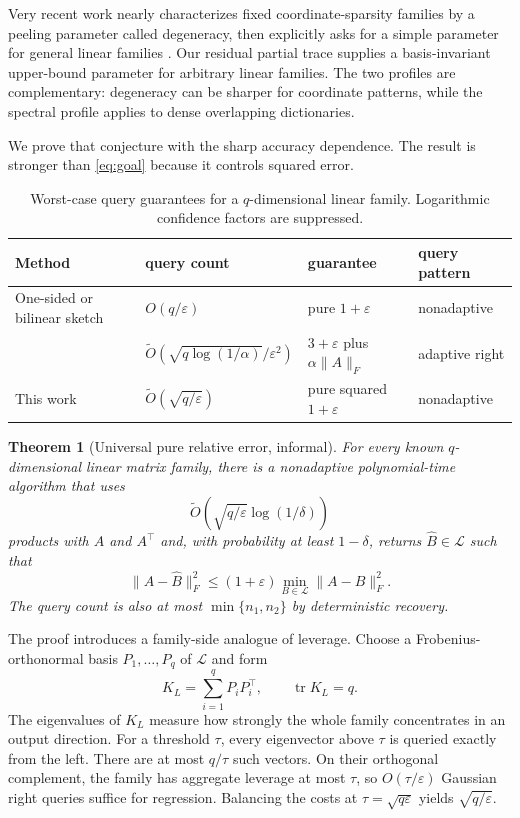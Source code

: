 \documentclass{article}
\newtheorem{theorem}{Theorem}
\theoremstyle{remark}
\newcommand{\cL}{\mathcal L}
\newcommand{\eps}{\varepsilon}
\newcommand{\tr}{\operatorname{tr}}
\newcommand{\wtO}{\widetilde O}
\newcommand{\1}{\mathbf 1}
\begin{document}
Very recent work nearly characterizes fixed coordinate-sparsity families by a peeling parameter called degeneracy, then explicitly asks for a simple parameter for general linear families \citep{musco2026instance}.  Our residual partial trace supplies a basis-invariant upper-bound parameter for arbitrary linear families.  The two profiles are complementary: degeneracy can be sharper for coordinate patterns, while the spectral profile applies to dense overlapping dictionaries.

We prove that conjecture with the sharp accuracy dependence.  The result is stronger than \eqref{eq:goal} because it controls squared error.

\begin{table}[t]
\centering
\small
\begin{tabular}{@{}llll@{}}
\toprule
Method & query count & guarantee & query pattern \\
\midrule
One-sided or bilinear sketch
& $O(q/\eps)$ & pure $1+\eps$ & nonadaptive \\
\citet{amsel2026query}
& $\wtO(\sqrt{q\log(1/\alpha)}/\eps^2)$
& $3+\eps$ plus $\alpha\|A\|_F$ & adaptive right \\
This work
& $\wtO(\sqrt{q/\eps})$ & pure squared $1+\eps$ & nonadaptive \\
\bottomrule
\end{tabular}
\caption{Worst-case query guarantees for a $q$-dimensional linear family.
Logarithmic confidence factors are suppressed.}
\label{tab:comparison}
\end{table}

\begin{theorem}[Universal pure relative error, informal]
\label{thm:intro-upper}
For every known $q$-dimensional linear matrix family, there is a nonadaptive polynomial-time algorithm that uses \[ \wtO\!\left(\sqrt{q/\eps}\log(1/\delta)\right) \] products with $A$ and $A^\top$ and, with probability at least $1-\delta$, returns $\widehat B\in\cL$ such that \[ \|A-\widehat B\|_F^2\le(1+\eps) \min_{B\in\cL}\|A-B\|_F^2. \] The query count is also at most $\min\{n_1,n_2\}$ by deterministic recovery.
\end{theorem}

The proof introduces a family-side analogue of leverage.  Choose a Frobenius-orthonormal basis $P_1,\ldots,P_q$ of $\cL$ and form
\begin{equation}
 K_L=\sum_{i=1}^qP_iP_i^\top,
 \qquad \tr K_L=q.
 \label{eq:partial-trace-intro}
\end{equation}
The eigenvalues of $K_L$ measure how strongly the whole family concentrates in an output direction.  For a threshold $\tau$, every eigenvector above $\tau$ is queried exactly from the left.  There are at most $q/\tau$ such vectors.  On their orthogonal complement, the family has aggregate leverage at most $\tau$, so $O(\tau/\eps)$ Gaussian right queries suffice for regression.  Balancing the costs at $\tau=\sqrt{q\eps}$ yields $\sqrt{q/\eps}$.
\end{document}
